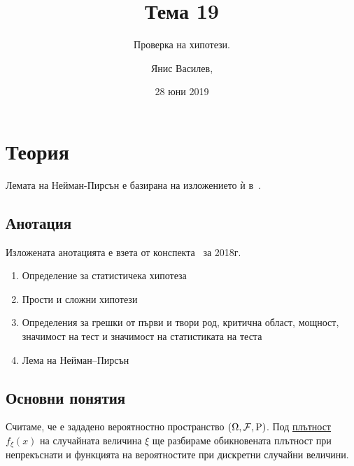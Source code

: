 \documentclass[numbers=endperiod, DIV=15, bibliography=totocnumbered]{scrartcl}
\title{Тема 19}
\subtitle{Проверка на хипотези.}
\author{Янис Василев, \Email{ianis@ivasilev.net}}
\date{28 юни 2019}
\begin{document}
\maketitle

\section{Теория}

Лемата на Нейман-Пирсън е базирана на изложението ѝ в~\cite{DimitrovYanev}.

\subsection{Анотация}

Изложената анотацията е взета от конспекта~\cite{Syllabus} за 2018г.

\begin{enumerate}
  \item Определение за статистичека хипотеза
  \item Прости и сложни хипотези
  \item Определения за грешки от първи и твори род, критична област, мощност, значимост на тест и значимост на статистиката на теста
  \item Лема на Нейман–Пирсън
\end{enumerate}

\subsection{Основни понятия}

Считаме, че е зададено вероятностно пространство $(\Omega, \mathcal{F}, \operatorname{P})$. Под \uline{плътност} $f_\xi(x)$ на случайната величина $\xi$ ще разбираме обикновената плътност при непрекъснати и функцията на вероятностите при дискретни случайни величини.
\end{document}
